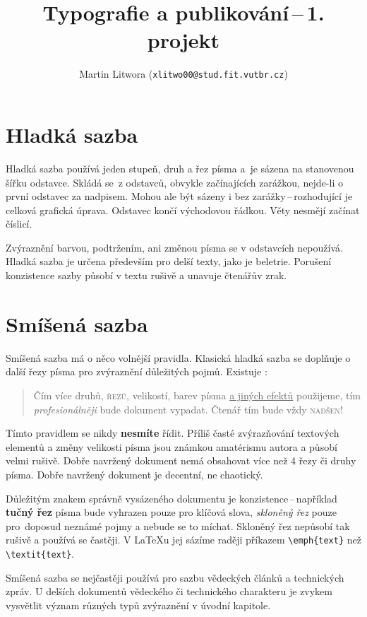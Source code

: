 \documentclass[a4paper,10pt,twocolumn]{article}
\title{Typografie a publikování\,--\,1. projekt}
\author{Martin Litwora (\texttt{xlitwo00@stud.fit.vutbr.cz})}
\date{}
\begin{document}
\maketitle

\section{Hladká sazba}
Hladká sazba používá jeden stupeň, druh a řez písma a~je sázena na stanovenou šířku odstavce. Skládá se~z odstavců, obvykle začínajících zarážkou, nejde-li o první odstavec za nadpisem. Mohou ale být sázeny i bez zarážky\,--\,rozhodující je celková grafická úprava. Odstavec končí východovou řádkou. Věty nesmějí začínat číslicí.\par

Zvýraznění barvou, podtržením, ani změnou písma se v odstavcích nepoužívá. Hladká sazba je určena především pro delší texty, jako je beletrie. Porušení konzistence sazby působí v textu rušivě a unavuje čtenářův zrak.

\section{Smíšená sazba}
Smíšená sazba má o něco volnější pravidla. Klasická hladká sazba se doplňuje o další řezy písma pro zvýraznění důležitých pojmů. Existuje :\par

\begin{quotation}
    {\selectfont Čím více druhů,} \textsc{řezů}, {\tiny velikostí}, barev písma \underline{a jiných efektů} použijeme, tím \textit{\large{profesionálněji}} bude dokument vypadat. Čtenář tím bude vždy \scshape{nadšen}!
\end{quotation}
Tímto pravidlem se nikdy \textbf{nesmíte} řídit. Příliš časté zvýrazňování textových elementů a změny velikosti {\LARGE písma} jsou známkou amatérismu autora a působí {\huge velmi} rušivě. Dobře navržený dokument nemá obsahovat více než
4 řezy či druhy písma. Dobře navržený dokument je decentní, ne chaotický.

Důležitým znakem správně vysázeného dokumentu je konzistence\,--\,například \textbf{tučný řez} písma bude vyhrazen pouze pro klíčová slova, \emph{skloněný řez} pouze pro~doposud neznámé pojmy a nebude se to míchat. Skloněný řez nepůsobí tak rušivě a používá se častěji. V \LaTeX u jej sázíme raději příkazem \verb|\emph{text}| než \verb|\textit{text}|.

Smíšená sazba se nejčastěji používá pro sazbu vědeckých článků a technických zpráv. U delších dokumentů vědeckého či technického charakteru je zvykem vysvětlit význam různých typů zvýraznění v úvodní kapitole.
\end{document}
